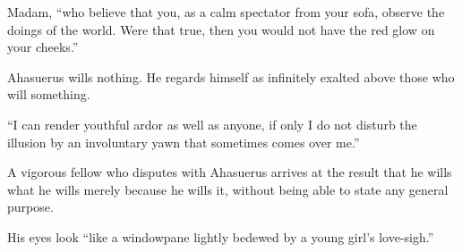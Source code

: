\documentclass[12pt,a4paper]{article}
\newcommand{\aphsep}{\par\smallskip\centerline{\textasteriskcentered}\smallskip}
\begin{document}
\aphsep

Madam, ``who believe that you, as a calm spectator from your sofa, observe the
doings of the world. Were that true, then you would not have the red glow on your
cheeks.''

\aphsep

Ahasuerus wills nothing. He regards himself as infinitely exalted above those who
will something.

\aphsep

``I can render youthful ardor as well as anyone, if only I do not disturb the
illusion by an involuntary yawn that sometimes comes over me.''

\aphsep

A vigorous fellow who disputes with Ahasuerus arrives at the result that he wills
what he wills merely because he wills it, without being able to state any general
purpose.

\aphsep

His eyes look ``like a windowpane lightly bedewed by a young girl's love-sigh.''
\end{document}
